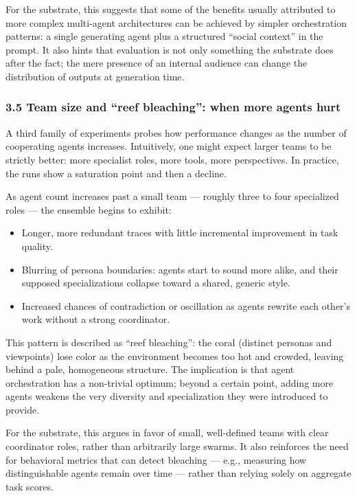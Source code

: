 For the substrate, this suggests that some of the benefits usually
attributed to more complex multi-agent architectures can be achieved by
simpler orchestration patterns: a single generating agent plus a
structured ``social context'' in the prompt. It also hints that
evaluation is not only something the substrate does after the fact; the
mere presence of an internal audience can change the distribution of
outputs at generation time.

\subsubsection{3.5 Team size and ``reef bleaching'': when more agents
hurt}\label{team-size-and-reef-bleaching-when-more-agents-hurt}

A third family of experiments probes how performance changes as the
number of cooperating agents increases. Intuitively, one might expect
larger teams to be strictly better: more specialist roles, more tools,
more perspectives. In practice, the runs show a saturation point and
then a decline.

As agent count increases past a small team --- roughly three to four
specialized roles --- the ensemble begins to exhibit:

\begin{itemize}
\tightlist
\item
  Longer, more redundant traces with little incremental improvement in
  task quality.
\item
  Blurring of persona boundaries: agents start to sound more alike, and
  their supposed specializations collapse toward a shared, generic
  style.
\item
  Increased chances of contradiction or oscillation as agents rewrite
  each other's work without a strong coordinator.
\end{itemize}

This pattern is described as ``reef bleaching'': the coral (distinct
personas and viewpoints) lose color as the environment becomes too hot
and crowded, leaving behind a pale, homogeneous structure. The
implication is that agent orchestration has a non-trivial optimum;
beyond a certain point, adding more agents weakens the very diversity
and specialization they were introduced to provide.

For the substrate, this argues in favor of small, well-defined teams
with clear coordinator roles, rather than arbitrarily large swarms. It
also reinforces the need for behavioral metrics that can detect
bleaching --- e.g., measuring how distinguishable agents remain over
time --- rather than relying solely on aggregate task scores.

